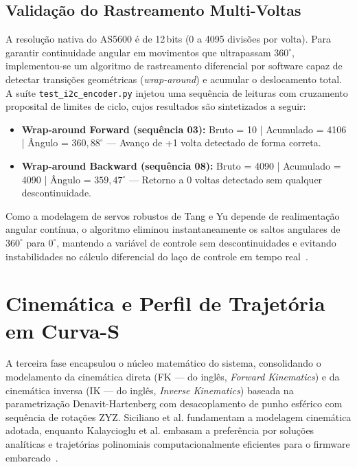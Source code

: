 \subsection{Validação do Rastreamento Multi-Voltas}
\label{subsec:dev_i2c_multivoltas}

A resolução nativa do AS5600 é de 12\,bits (0 a 4095 divisões por volta). Para garantir continuidade angular em movimentos que ultrapassam $360^{\circ}$, implementou-se um algoritmo de rastreamento diferencial por software capaz de detectar transições geométricas (\textit{wrap-around}) e acumular o deslocamento total. A suíte \texttt{test\_i2c\_encoder.py} injetou uma sequência de leituras com cruzamento proposital de limites de ciclo, cujos resultados são sintetizados a seguir:

\begin{itemize}
    \item \textbf{Wrap-around Forward (sequência 03):} Bruto = 10 | Acumulado = 4106 | Ângulo = $360{,}88^{\circ}$ --- Avanço de +1 volta detectado de forma correta.
    \item \textbf{Wrap-around Backward (sequência 08):} Bruto = 4090 | Acumulado = 4090 | Ângulo = $359{,}47^{\circ}$ --- Retorno a 0 voltas detectado sem qualquer descontinuidade.
\end{itemize}

Como a modelagem de servos robustos de Tang e Yu depende de realimentação angular contínua, o algoritmo eliminou instantaneamente os saltos angulares de $360^{\circ}$ para $0^{\circ}$, mantendo a variável de controle sem descontinuidades e evitando instabilidades no cálculo diferencial do laço de controle em tempo real~\cite{tang2022research}.

\section{Cinemática e Perfil de Trajetória em Curva-S}
\label{sec:dev_cinematica}

A terceira fase encapsulou o núcleo matemático do sistema, consolidando o modelamento da cinemática direta (FK --- do inglês, \textit{Forward Kinematics}) e da cinemática inversa (IK --- do inglês, \textit{Inverse Kinematics}) baseada na parametrização Denavit-Hartenberg com desacoplamento de punho esférico com sequência de rotações ZYZ. Siciliano et al. fundamentam a modelagem cinemática adotada, enquanto Kalaycioglu et al. embasam a preferência por soluções analíticas e trajetórias polinomiais computacionalmente eficientes para o firmware embarcado~\cite{siciliano2009robotics, kalaycioglu2024analytical}.

